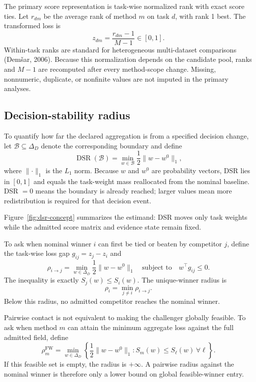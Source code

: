\documentclass[11pt]{article}
\begin{document}
The primary score representation is task-wise normalized rank with exact score ties. Let $r_{dm}$ be the average rank of method $m$ on task $d$, with rank 1 best. The transformed loss is
\[
z_{dm}=\frac{r_{dm}-1}{M-1}\in[0,1].
\]
Within-task ranks are standard for heterogeneous multi-dataset comparisons (Demšar, 2006). Because this normalization depends on the candidate pool, ranks and $M-1$ are recomputed after every method-scope change. Missing, nonnumeric, duplicate, or nonfinite values are not imputed in the primary analyses.

\subsection{Decision-stability radius}

To quantify how far the declared aggregation is from a specified decision change, let $\mathcal{B}\subseteq\Delta_D$ denote the corresponding boundary and define
\begin{equation}
\operatorname{DSR}(\mathcal{B})=\min_{w\in\mathcal{B}}\frac12\lVert w-w^0\rVert_1,
\label{eq:dsr}
\end{equation}
where $\lVert\cdot\rVert_1$ is the $L_1$ norm. Because $w$ and $w^0$ are probability vectors, DSR lies in $[0,1]$ and equals the task-weight mass reallocated from the nominal baseline. DSR $=0$ means the boundary is already reached; larger values mean more redistribution is required for that decision event.

Figure~\ref{fig:dsr-concept} summarizes the estimand: DSR moves only task weights while the admitted score matrix and evidence state remain fixed.



To ask when nominal winner $i$ can first be tied or beaten by competitor $j$, define the task-wise loss gap $g_{ij}=z_j-z_i$ and
\begin{equation}
\rho_{i\rightarrow j}=
\min_{w\in\Delta_D}\frac12\lVert w-w^0\rVert_1
\quad\text{subject to}\quad
w^\top g_{ij}\le0.
\label{eq:pairwise}
\end{equation}
The inequality is exactly $S_j(w)\le S_i(w)$. The unique-winner radius is
\begin{equation}
\rho_i=\min_{j\ne i}\rho_{i\rightarrow j}.
\label{eq:winner}
\end{equation}
Below this radius, no admitted competitor reaches the nominal winner.

Pairwise contact is not equivalent to making the challenger globally feasible. To ask when method $m$ can attain the minimum aggregate loss against the full admitted field, define
\begin{equation}
\rho_m^{\mathrm{FW}}=
\min_{w\in\Delta_D}\left\{\frac12\lVert w-w^0\rVert_1:S_m(w)\le S_\ell(w)\ \forall \ell\right\}.
\label{eq:global}
\end{equation}
If this feasible set is empty, the radius is $+\infty$. A pairwise radius against the nominal winner is therefore only a lower bound on global feasible-winner entry.
\end{document}
